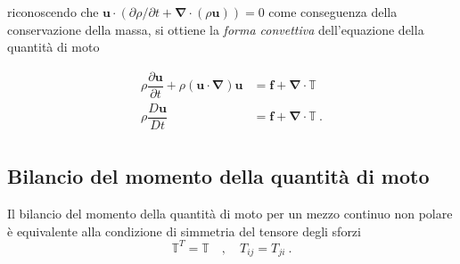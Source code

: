  riconoscendo che $\bm{u} \cdot (\partial \rho/\partial t + \bm{\nabla} \cdot (\rho \bm{u}))=0$ come conseguenza della conservazione della massa, si ottiene la \textit{forma convettiva} dell'equazione della quantità di moto
\begin{fBox}
 \begin{equation}
  \begin{aligned}
   \rho \dfrac{\partial\bm{u}}{\partial t}  +  \rho (\bm{u}  \cdot \bm{\nabla} ) \bm{u}& = \bm{f} + \bm{\nabla} \cdot \mathbb{T}  \\ 
   \rho \dfrac{D \bm{u}}{D t} & = \bm{f} + \bm{\nabla} \cdot \mathbb{T} \ . \\ 
  \end{aligned}
 \end{equation}
\end{fBox}

\subsection{Bilancio del momento della quantità di moto}
Il bilancio del momento della quantità di moto per un mezzo continuo non polare è equivalente alla condizione di simmetria del tensore degli sforzi
\begin{equation}
 \mathbb{T}^T = \mathbb{T} \quad , \quad T_{ij} = T_{ji} \ .
\end{equation}

